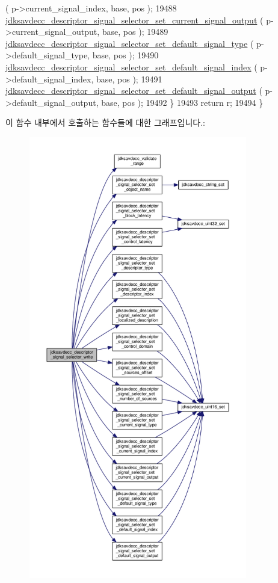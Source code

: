 \begin{DoxyCode}
      ( p->current\_signal\_index, base, pos );
19488         \hyperlink{group__descriptor__signal__selector_gaf007dc407a2fd4153738ea1b246bce95}{jdksavdecc\_descriptor\_signal\_selector\_set\_current\_signal\_output}
      ( p->current\_signal\_output, base, pos );
19489         \hyperlink{group__descriptor__signal__selector_ga955082c62bbac4382f693f7f58dba39f}{jdksavdecc\_descriptor\_signal\_selector\_set\_default\_signal\_type}
      ( p->default\_signal\_type, base, pos );
19490         \hyperlink{group__descriptor__signal__selector_gaaf90c06e5370018a979cd955de5101e7}{jdksavdecc\_descriptor\_signal\_selector\_set\_default\_signal\_index}
      ( p->default\_signal\_index, base, pos );
19491         \hyperlink{group__descriptor__signal__selector_ga261d73b5ac13d7c610e2ef5004dc8951}{jdksavdecc\_descriptor\_signal\_selector\_set\_default\_signal\_output}
      ( p->default\_signal\_output, base, pos );
19492     \}
19493     \textcolor{keywordflow}{return} r;
19494 \}
\end{DoxyCode}


이 함수 내부에서 호출하는 함수들에 대한 그래프입니다.\+:
\nopagebreak
\begin{figure}[H]
\begin{center}
\leavevmode
\includegraphics[height=550pt]{group__descriptor__signal__selector_gaf0cdb035cbad116f2e677246fe2ae2b0_cgraph}
\end{center}
\end{figure}


